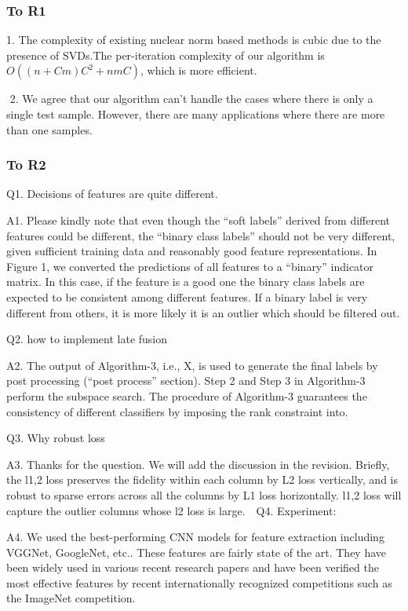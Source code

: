 \documentclass[letterpaper]{article}
\begin{document}
\subsubsection{To R1 }

1. The complexity of existing nuclear norm based methods is cubic due to the presence of SVDs.The per-iteration complexity of our algorithm is $O((n+Cm)C^2 +nmC)$, which is more efficient. 

 2. We agree that our algorithm can’t handle the cases where there is only a single test sample. However, there are many applications where there are more than one samples.

\subsubsection{To R2}

Q1. Decisions of features are quite different. 

A1. 
Please kindly note that even though the “soft labels” derived from different features could be different,
the “binary class labels” should not be very different,
given sufficient training data and reasonably good feature representations.
In Figure 1, we converted the predictions of all features to a “binary” indicator matrix.
In this case, if the feature is a good one the binary class labels are expected to be consistent among different features.
If a binary label is very different from others, it is more likely it is an outlier which should be filtered out. 


Q2. how to implement late fusion  

A2. The output of Algorithm-3, i.e., X, is used to generate the final labels by post processing (“post process” section). Step 2 and Step 3 in Algorithm-3 perform the subspace search. The procedure of Algorithm-3 guarantees the consistency of different classifiers by imposing the rank constraint into.

Q3. Why robust loss

A3. Thanks for the question. We will add the discussion in the revision. Briefly, the l1,2 loss preserves the fidelity within each column by L2 loss vertically, and is robust to sparse errors across all the columns by L1 loss horizontally.  l1,2 loss will capture the outlier columns whose l2 loss is large. 
 
Q4. Experiment: 

A4. We used the best-performing CNN models for feature extraction including VGGNet, GoogleNet, etc..  These features are fairly state of the art. They have been widely used in various recent research papers and have been verified the most effective features by recent internationally recognized competitions such as the ImageNet competition.
   
\end{document}
